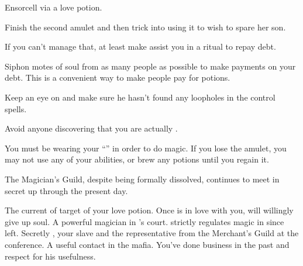 \documentclass[char]{NeptuneBall}
\begin{document}
\begin{itemz}[Goals]
  \item Ensorcell \cKing{\King} \cKing{} via a love potion.
  \item Finish the second amulet and then trick \cAriel{} into using it to wish to spare her son.
  \item If you can't manage that, at least make \cAriel{} assist you in a \gRitual{} ritual to repay \cAriel{\their} debt.
  \item Siphon motes of soul from as many people as possible to make payments on your debt. This is a convenient way to make people pay for potions.
  \item Keep an eye on \cSlave{} and make sure he hasn't found any loopholes in the control spells.
  \item Avoid anyone discovering that you are actually \cWitch{}.
\end{itemz}

\begin{itemz}[Notes]
  \item You must be wearing your ``\iAmulet{}'' in order to do magic. If you lose the amulet, you may not use any of your abilities, or brew any potions until you regain it.
\end{itemz}

\begin{itemz}[Trivia]
  \item The Magician's Guild, despite being formally dissolved, continues to meet in secret up through the present day.
\end{itemz}

\begin{contacts}
  \contact{\cKing{}} The current \cKing{\King} of \pAtlantis{} target of your love potion. Once \cKing{\they} is in love with you, \cKing{\they} will willingly give up \cKing{\them} soul.
  \contact{\cManta{}} A powerful magician in \cKing{}'s court. \cManta{\They} strictly regulates magic in \pAtlantis{} since \cAriel{} left.
  \contact{\cSlave{\MYname}} Secretly \cSlave{}, your slave and the representative from the Merchant's Guild at the conference.
  \contact{\cPriest{}} A useful contact in the mafia. You've done business in the past and respect \cPriest{\them} for his usefulness.
\end{contacts}
\end{document}
